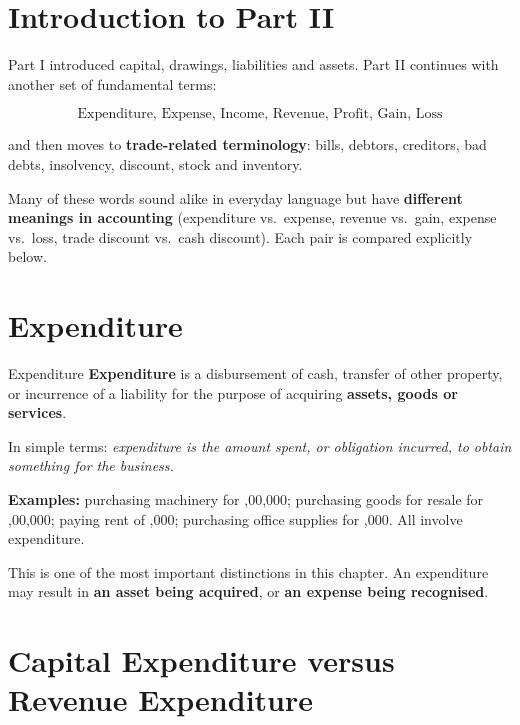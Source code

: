 \documentclass[11pt,a4paper]{article}
\newcommand{\Rs}{\ifmmode\text{\rsfont ₹}\else{\rsfont ₹}\fi}
\begin{document}
\section{Introduction to Part II}

Part I introduced capital, drawings, liabilities and assets. Part II continues with another set of fundamental
terms:

\[
\boxed{\text{Expenditure, Expense, Income, Revenue, Profit, Gain, Loss}}
\]

and then moves to \textbf{trade-related terminology}: bills, debtors, creditors, bad debts, insolvency, discount,
stock and inventory.

\begin{impbox}
Many of these words sound alike in everyday language but have \textbf{different meanings in accounting}
(expenditure vs.\ expense, revenue vs.\ gain, expense vs.\ loss, trade discount vs.\ cash discount). Each
pair is compared explicitly below.
\end{impbox}

\section{Expenditure}

\begin{defbox}{Expenditure}
\textbf{Expenditure} is a disbursement of cash, transfer of other property, or incurrence of a liability for the
purpose of acquiring \textbf{assets, goods or services}.
\end{defbox}

In simple terms: \emph{expenditure is the amount spent, or obligation incurred, to obtain something for the
business.}

\textbf{Examples:} purchasing machinery for \Rs 5,00,000; purchasing goods for resale for \Rs 1,00,000; paying
rent of \Rs 20,000; purchasing office supplies for \Rs 5,000. All involve expenditure.

\begin{impbox}
This is one of the most important distinctions in this chapter. An expenditure may result in
\textbf{an asset being acquired}, or \textbf{an expense being recognised}.
\end{impbox}

\section{Capital Expenditure versus Revenue Expenditure}
\end{document}
